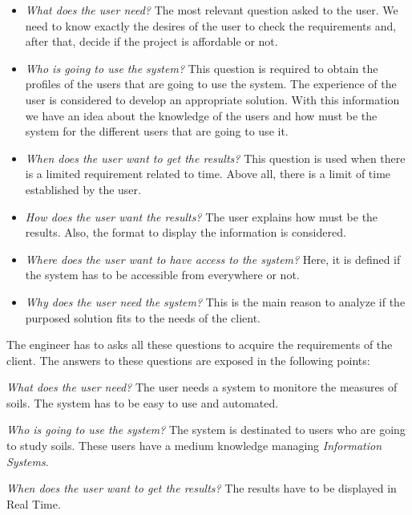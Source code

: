 \begin{itemize}

\item \textit{What does the user need?} The most relevant question asked to the user. We need to know exactly the desires of the user to check the requirements and, after that, decide if the project is affordable or not.

\item \textit{Who is going to use the system?} This question is required to obtain the profiles of the users that are going to use the system. The experience of the user is considered to develop an appropriate solution. With this information we have an idea about the knowledge of the users and how must be the system for the different users that are going to use it.

\item \textit{When does the user want to get the results?} This question is used when there is a limited requirement related to time. Above all, there is a limit of time established by the user.

\item \textit{How does the user want the results?} The user explains how must be the results. Also, the format to display the information is considered.

\item \textit{Where does the user want to have access to the system?} Here, it is defined if the system has to be accessible from everywhere or not.

\item \textit{Why does the user need the system?} This is the main reason to analyze if the purposed solution fits to the needs of the client.

\end{itemize}

The engineer has to asks all these questions to acquire the requirements of the client. The answers to these questions are exposed in the following points:

\item \textit{What does the user need?} The user needs a system to monitore the measures of soils. The system has to be easy to use and automated.

\item \textit{Who is going to use the system?} The system is destinated to users who are going to study soils. These users have a medium knowledge managing \textit{Information Systems}.

\item \textit{When does the user want to get the results?} The results have to be displayed in Real Time.

